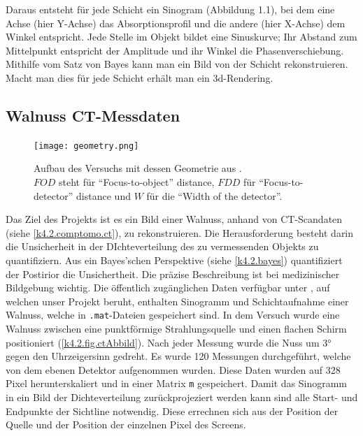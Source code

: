 Daraus entsteht für jede Schicht ein Sinogram (Abbildung 1.1), bei dem eine Achse (hier Y-Achse) das Absorptionsprofil und die andere (hier X-Achse) dem Winkel entspricht. Jede Stelle im Objekt bildet eine Sinuskurve; Ihr Abstand zum Mittelpunkt entspricht der Amplitude und ihr Winkel die Phasenverschiebung. Mithilfe vom Satz von Bayes kann man ein Bild von der Schicht rekonstruieren. Macht man dies für jede Schicht erhält man ein 3d-Rendering.


\subsection{Walnuss CT-Messdaten}\label{k4.2.ct.walnuss}
\begin{figure}
	\centering
	\texttt{[image: geometry.png]}
	\caption{Aufbau des Versuchs mit dessen Geometrie aus \textcite{k4.2.art.walnutXRay}.\\
	$FOD$ steht für \enquote{Focus-to-object} distance, $FDD$ für \enquote{Focus-to-detector} distance und $W$ für die \enquote{Width of the detector}.
	}
	\label{k4.2.fig.geo}
\end{figure}

Das Ziel des Projekts ist es ein Bild einer Walnuss, anhand von CT-Scandaten (siehe \cref{k4.2.comptomo.ct}), zu rekonstruieren. Die Herausforderung besteht darin die Unsicherheit in der DIchteverteilung des zu vermessenden Objekts zu quantifiziern. Aus ein Bayes'schen Perspektive (siehe \cref{k4.2.bayes}) quantifiziert der Postirior die Unsichertheit. Die präzise Beschreibung ist bei medizinischer Bildgebung wichtig.
Die öffentlich zugänglichen Daten verfügbar unter , auf welchen unser Projekt beruht, enthalten Sinogramm und Schichtaufnahme einer Walnuss, welche in \verb|.mat|-Dateien gespeichert sind.
In dem Versuch wurde eine Walnuss zwischen eine punktförmige Strahlungsquelle und einen flachen Schirm positioniert (\cref{k4.2.fig.ctAbbild}). Nach jeder Messung wurde die Nuss um 3° gegen den Uhrzeigersinn gedreht.
Es wurde 120 Messungen durchgeführt, welche von dem ebenen Detektor aufgenommen wurden. Diese Daten wurden auf 328 Pixel herunterskaliert und in einer Matrix \verb|m| gespeichert.
 Damit das Sinogramm in ein Bild der Dichteverteilung zurückprojeziert werden kann sind alle Start- und Endpunkte der Sichtline notwendig. Diese errechnen sich aus der Position der Quelle und der Position der einzelnen Pixel des Screens.\\


